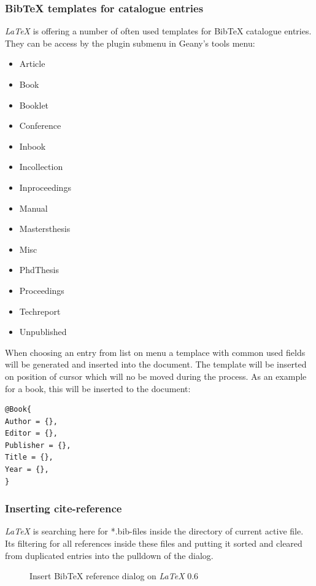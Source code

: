 \documentclass[%
paper=a4,%
fontsize=11pt,%
twoside=false,%
DIV18,%
headsepline,%
plainheadsepline,%
footsepline,%
plainfootsepline,%
bibliography=totoc,%
listof=totoc,%
BCOR10mm,%
parskip=half,%
openany,%
]{scrartcl}
\begin{document}
\subsubsection{BibTeX templates for catalogue entries}
\textit{LaTeX} is offering a number of often used templates for BibTeX
catalogue entries. They can be access by the plugin submenu in Geany's
tools menu:
\begin{itemize}
	\item Article
	\item Book
	\item Booklet
	\item Conference
	\item Inbook
	\item Incollection
	\item Inproceedings
	\item Manual
	\item Mastersthesis
	\item Misc
	\item PhdThesis
	\item Proceedings
	\item Techreport
	\item Unpublished
\end{itemize}
When choosing an entry from list on menu a templace with common used
fields will be generated and inserted into the document.
The template will be inserted on position of cursor which will
no be moved during the process. As an example for a book, this will be
inserted to the document:

\begin{lstlisting}[caption={Example of BibTeX entry for a book}]
@Book{
Author = {},
Editor = {},
Publisher = {},
Title = {},
Year = {},
}
\end{lstlisting}


\subsubsection{Inserting cite-reference}

\textit{LaTeX} is searching here for *.bib-files inside the directory
of current active file. Its filtering for all references inside
these files and putting it sorted and cleared from duplicated
entries into the pulldown of the dialog.

\begin{figure}[h!]
	\caption{Insert BibTeX reference dialog on \textit{LaTeX} 0.6}
\end{figure}
\end{document}
